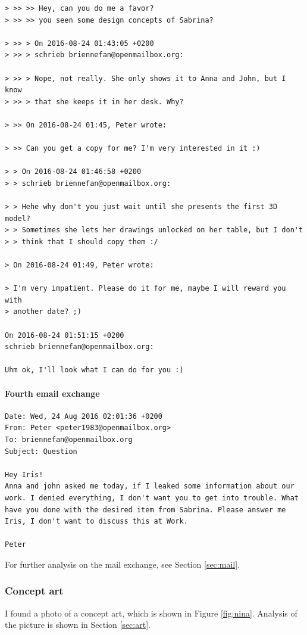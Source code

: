 \documentclass[12pt]{article}
\begin{document}
\begin{verbatim}
> >> >> Hey, can you do me a favor?
> >> >> you seen some design concepts of Sabrina?

> >> > On 2016-08-24 01:43:05 +0200
> >> > schrieb briennefan@openmailbox.org:

> >> > Nope, not really. She only shows it to Anna and John, but I know
> >> > that she keeps it in her desk. Why?

> >> On 2016-08-24 01:45, Peter wrote:

> >> Can you get a copy for me? I'm very interested in it :)

> > On 2016-08-24 01:46:58 +0200
> > schrieb briennefan@openmailbox.org:

> > Hehe why don't you just wait until she presents the first 3D model?
> > Sometimes she lets her drawings unlocked on her table, but I don't
> > think that I should copy them :/

> On 2016-08-24 01:49, Peter wrote:

> I'm very impatient. Please do it for me, maybe I will reward you with 
> another date? ;)

On 2016-08-24 01:51:15 +0200
schrieb briennefan@openmailbox.org:

Uhm ok, I'll look what I can do for you :)
\end{verbatim}

\paragraph{Fourth email exchange}

\begin{verbatim}
Date: Wed, 24 Aug 2016 02:01:36 +0200
From: Peter <peter1983@openmailbox.org>
To: briennefan@openmailbox.org
Subject: Question

Hey Iris!
Anna and john asked me today, if I leaked some information about our
work. I denied everything, I don't want you to get into trouble. What
have you done with the desired item from Sabrina. Please answer me
Iris, I don't want to discuss this at Work.

Peter
\end{verbatim}
For further analysis on the mail exchange, see Section \ref{sec:mail}.

\subsubsection{Concept art}

I found a photo of a concept art, which is shown in Figure \ref{fig:nina}. Analysis of the picture is shown in Section \ref{sec:art}.
\end{document}
